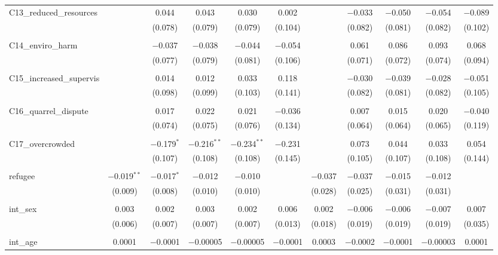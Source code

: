 \begin{table}[H]
\begin{tabular}{@{\extracolsep{4pt}}lcccccccccc}
 C13\_reduced\_resources &  & 0.044 & 0.043 & 0.030 & 0.002 &  & $-$0.033 & $-$0.050 & $-$0.054 & $-$0.089 \\ 
  &  & (0.078) & (0.079) & (0.079) & (0.104) &  & (0.082) & (0.081) & (0.082) & (0.102) \\ 
  & & & & & & & & & & \\ 
 C14\_enviro\_harm &  & $-$0.037 & $-$0.038 & $-$0.044 & $-$0.054 &  & 0.061 & 0.086 & 0.093 & 0.068 \\ 
  &  & (0.077) & (0.079) & (0.081) & (0.106) &  & (0.071) & (0.072) & (0.074) & (0.094) \\ 
  & & & & & & & & & & \\ 
 C15\_increased\_supervis &  & 0.014 & 0.012 & 0.033 & 0.118 &  & $-$0.030 & $-$0.039 & $-$0.028 & $-$0.051 \\ 
  &  & (0.098) & (0.099) & (0.103) & (0.141) &  & (0.082) & (0.081) & (0.082) & (0.105) \\ 
  & & & & & & & & & & \\ 
 C16\_quarrel\_dispute &  & 0.017 & 0.022 & 0.021 & $-$0.036 &  & 0.007 & 0.015 & 0.020 & $-$0.040 \\ 
  &  & (0.074) & (0.075) & (0.076) & (0.134) &  & (0.064) & (0.064) & (0.065) & (0.119) \\ 
  & & & & & & & & & & \\ 
 C17\_overcrowded &  & $-$0.179$^{*}$ & $-$0.216$^{**}$ & $-$0.234$^{**}$ & $-$0.231 &  & 0.073 & 0.044 & 0.033 & 0.054 \\ 
  &  & (0.107) & (0.108) & (0.108) & (0.145) &  & (0.105) & (0.107) & (0.108) & (0.144) \\ 
  & & & & & & & & & & \\ 
 refugee & $-$0.019$^{**}$ & $-$0.017$^{*}$ & $-$0.012 & $-$0.010 &  & $-$0.037 & $-$0.037 & $-$0.015 & $-$0.012 &  \\ 
  & (0.009) & (0.008) & (0.010) & (0.010) &  & (0.028) & (0.025) & (0.031) & (0.031) &  \\ 
  & & & & & & & & & & \\ 
 int\_sex & 0.003 & 0.002 & 0.003 & 0.002 & 0.006 & 0.002 & $-$0.006 & $-$0.006 & $-$0.007 & 0.007 \\ 
  & (0.006) & (0.007) & (0.007) & (0.007) & (0.013) & (0.018) & (0.019) & (0.019) & (0.019) & (0.035) \\ 
  & & & & & & & & & & \\ 
 int\_age & 0.0001 & $-$0.0001 & $-$0.00005 & $-$0.00005 & $-$0.0001 & 0.0003 & $-$0.0002 & $-$0.0001 & $-$0.00003 & 0.0001 \\ 

\end{tabular}
\end{table}
